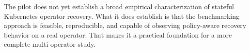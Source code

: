 \documentclass[11pt,a4paper]{article}
\begin{document}
The pilot does not yet establish a broad empirical characterization of
stateful Kubernetes operator recovery. What it does establish is that the
benchmarking approach is feasible, reproducible, and capable of observing
policy-aware recovery behavior on a real operator. That makes it a practical
foundation for a more complete multi-operator study.



\end{document}
